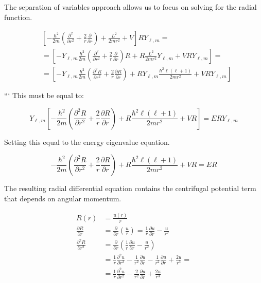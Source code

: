 \documentclass[10pt]{article}
\begin{document}
The separation of variables approach allows us to focus on solving for the radial function.

\begin{align*}
& {\left[-\frac{\hbar^{2}}{2 m}\left(\frac{\partial^{2}}{\partial r^{2}}+\frac{2}{r} \frac{\partial}{\partial r}\right)+\frac{L^{2}}{2 m r^{2}}+V\right] R Y_{\ell, m}=} \\
& =\left[-Y_{\ell, m} \frac{\hbar^{2}}{2 m}\left(\frac{\partial^{2}}{\partial r^{2}}+\frac{2}{r} \frac{\partial}{\partial r}\right) R+R \frac{L^{2}}{2 m r^{2}} Y_{\ell, m}+V R Y_{\ell, m}\right]=  \tag{9.31}\\
& =\left[-Y_{\ell, m} \frac{\hbar^{2}}{2 m}\left(\frac{\partial^{2} R}{\partial r^{2}}+\frac{2}{r} \frac{\partial R}{\partial r}\right)+R Y_{\ell, m} \frac{\hbar^{2} \ell(\ell+1)}{2 m r^{2}}+V R Y_{\ell, m}\right]
\end{align*}

```
This must be equal to:

\begin{equation*}
Y_{\ell, m}\left[-\frac{\hbar^{2}}{2 m}\left(\frac{\partial^{2} R}{\partial r^{2}}+\frac{2}{r} \frac{\partial R}{\partial r}\right)+R \frac{\hbar^{2} \ell(\ell+1)}{2 m r^{2}}+V R\right]=E R Y_{\ell, m} \tag{9.32}
\end{equation*}

Setting this equal to the energy eigenvalue equation.

\begin{equation*}
-\frac{\hbar^{2}}{2 m}\left(\frac{\partial^{2} R}{\partial r^{2}}+\frac{2}{r} \frac{\partial R}{\partial r}\right)+R \frac{\hbar^{2} \ell(\ell+1)}{2 m r^{2}}+V R=E R \tag{9.33}
\end{equation*}

The resulting radial differential equation contains the centrifugal potential term that depends on angular momentum.

\begin{align*}
R(r) & =\frac{u(r)}{r} \\
\frac{\partial R}{\partial r} & =\frac{\partial}{\partial r}\left(\frac{u}{r}\right)=\frac{1}{r} \frac{\partial u}{\partial r}-\frac{u}{r^{2}} \\
\frac{\partial^{2} R}{\partial r^{2}} & =\frac{\partial}{\partial r}\left(\frac{1}{r} \frac{\partial u}{\partial r}-\frac{u}{r^{2}}\right)  \tag{9.34}\\
& =\frac{1}{r} \frac{\partial^{2} u}{\partial r^{2}}-\frac{1}{r^{2}} \frac{\partial u}{\partial r}-\frac{1}{r^{2}} \frac{\partial u}{\partial r}+\frac{2 u}{r^{3}}= \\
& =\frac{1}{r} \frac{\partial^{2} u}{\partial r^{2}}-\frac{2}{r^{2}} \frac{\partial u}{\partial r}+\frac{2 u}{r^{3}}
\end{align*}
\end{document}
